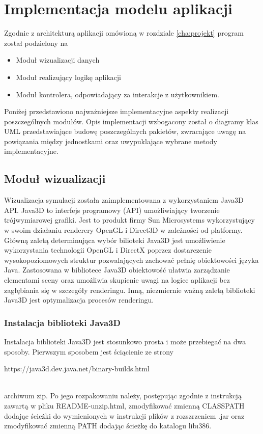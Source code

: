 \section {Implementacja modelu aplikacji}
Zgodnie z architekturą aplikacji omówioną w rozdziale \ref{cha:projekt} program został podzielony na 
\begin{itemize}
\item Moduł wizualizacji danych
\item Moduł realizujący logikę aplikacji
\item Moduł kontrolera, odpowiadający za interakcje z użytkownikiem.
\end{itemize}
Poniżej przedstawiono najważniejsze implementacyjne aspekty realizacji poszczególnych modułów.
Opis implementacji wzbogacony został o diagramy klas UML przedstawiające budowę poszczególnych pakietów, zwracające uwagę na powiązania między jednostkami oraz uwypuklające wybrane metody implementacyjne.
\subsection {Moduł wizualizacji}
Wizualizacja symulacji została zaimplementowana z wykorzystaniem Java3D API.
Java3D to interfejs programowy (API) umożliwiający tworzenie trójwymiarowej grafiki. Jest to produkt firmy Sun Microsystems wykorzystujący w swoim działaniu renderery OpenGL i Direct3D w zależności od platformy.
Główną zaletą determinująca wybór bilioteki Java3D jest umożliwienie wykorzystania technologii OpenGL i DirectX poprzez dostarczenie wysokopoziomowych struktur pozwalających zachować pełnię obiektowości języka Java. 
Zastosowana w bibliotece Java3D obiektowość ułatwia zarządzanie elementami sceny oraz umożliwia skupienie uwagi na logice aplikacji bez zagłębiania się w szczegóły renderingu. Inną, niezmiernie ważną zaletą biblioteki Java3D jest optymalizacja procesów renderingu.
\subsubsection{Instalacja biblioteki Java3D}
Instalacja biblioteki Java3D jest stosunkowo prosta i może przebiegać na dwa sposoby.
Pierwszym sposobem jest ściącienie ze strony 
\begin{center}
https://java3d.dev.java.net/binary-builds.html
\end{center} \\
 archiwum zip. Po jego rozpakowaniu należy, postępując zgodnie z instrukcją zawartą w pliku README-unzip.html, zmodyfikować zmienną CLASSPATH dodając ścieżki do wymienionych w instrukcji plików z rozszrzeniem .jar oraz zmodyfikować zmienną PATH dodając ścieżkę do katalogu lib\i386.


